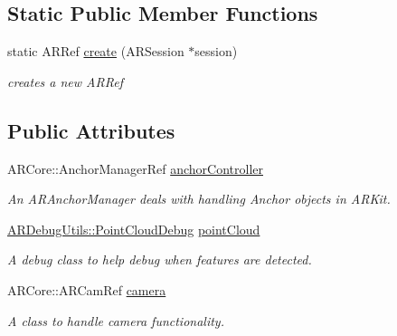\subsection*{Static Public Member Functions}
\begin{DoxyCompactItemize}
\item 
\mbox{\label{class_a_r_processor_affa1cf36e94e3015c436fd30626dd773}} 
static A\+R\+Ref \hyperlink{class_a_r_processor_affa1cf36e94e3015c436fd30626dd773}{create} (A\+R\+Session $\ast$session)
\begin{DoxyCompactList}\small\item\em creates a new A\+R\+Ref \end{DoxyCompactList}\end{DoxyCompactItemize}
\subsection*{Public Attributes}
\begin{DoxyCompactItemize}
\item 
\mbox{\label{class_a_r_processor_a8a1a8f16b30d2b0b4839a30d7ba4763d}} 
A\+R\+Core\+::\+Anchor\+Manager\+Ref \hyperlink{class_a_r_processor_a8a1a8f16b30d2b0b4839a30d7ba4763d}{anchor\+Controller}
\begin{DoxyCompactList}\small\item\em An A\+R\+Anchor\+Manager deals with handling Anchor objects in A\+R\+Kit. \end{DoxyCompactList}\item 
\mbox{\label{class_a_r_processor_a555e829fbf6b625537f6fd7cd9557002}} 
\hyperlink{class_a_r_debug_utils_1_1_point_cloud_debug}{A\+R\+Debug\+Utils\+::\+Point\+Cloud\+Debug} \hyperlink{class_a_r_processor_a555e829fbf6b625537f6fd7cd9557002}{point\+Cloud}
\begin{DoxyCompactList}\small\item\em A debug class to help debug when features are detected. \end{DoxyCompactList}\item 
\mbox{\label{class_a_r_processor_a0df4995c56cb187db281726d7631d9ed}} 
A\+R\+Core\+::\+A\+R\+Cam\+Ref \hyperlink{class_a_r_processor_a0df4995c56cb187db281726d7631d9ed}{camera}
\begin{DoxyCompactList}\small\item\em A class to handle camera functionality. \end{DoxyCompactList}\end{DoxyCompactItemize}



